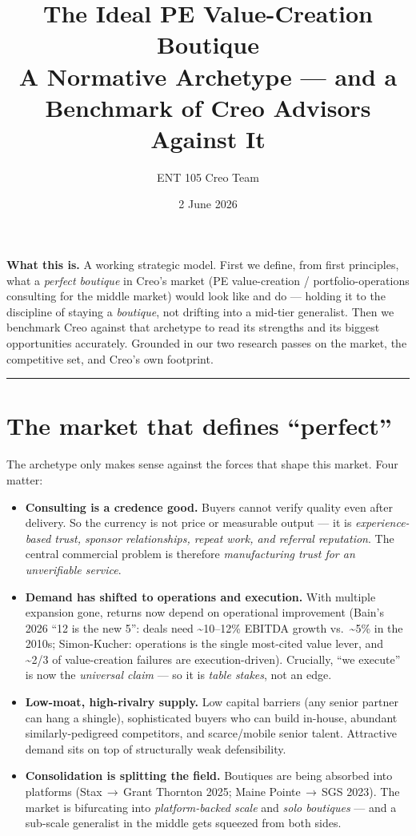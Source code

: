 \documentclass[11pt]{article}
\title{\textbf{The Ideal PE Value-Creation Boutique}\\[3pt]
\large A Normative Archetype --- and a Benchmark of Creo Advisors Against It}
\author{\normalsize ENT 105 Creo Team}
\date{\normalsize 2 June 2026}
\begin{document}
\maketitle

\begin{takeaway}
\textbf{What this is.} A working strategic model. First we define, from first
principles, what a \emph{perfect boutique} in Creo's market (PE value-creation /
portfolio-operations consulting for the middle market) would look like and do --- holding
it to the discipline of staying a \emph{boutique}, not drifting into a mid-tier generalist.
Then we benchmark Creo against that archetype to read its strengths and its biggest
opportunities accurately. Grounded in our two research passes on the market, the competitive
set, and Creo's own footprint.
\end{takeaway}

\tableofcontents
\vspace{0.8em}\hrule\vspace{0.8em}

\section{The market that defines ``perfect''}
The archetype only makes sense against the forces that shape this market. Four matter:

\begin{itemize}
  \item \textbf{Consulting is a credence good.} Buyers cannot verify quality even after
  delivery. So the currency is not price or measurable output --- it is
  \emph{experience-based trust, sponsor relationships, repeat work, and referral
  reputation}. The central commercial problem is therefore \emph{manufacturing trust for an
  unverifiable service}.
  \item \textbf{Demand has shifted to operations and execution.} With multiple expansion
  gone, returns now depend on operational improvement (Bain's 2026 ``12 is the new 5'':
  deals need \textasciitilde{}10--12\% EBITDA growth vs.\ \textasciitilde{}5\% in the 2010s;
  Simon-Kucher: operations is the single most-cited value lever, and \textasciitilde{}2/3
  of value-creation failures are execution-driven). Crucially, ``we execute'' is now the
  \emph{universal claim} --- so it is \emph{table stakes}, not an edge.
  \item \textbf{Low-moat, high-rivalry supply.} Low capital barriers (any senior partner
  can hang a shingle), sophisticated buyers who can build in-house, abundant
  similarly-pedigreed competitors, and scarce/mobile senior talent. Attractive demand sits
  on top of structurally weak defensibility.
  \item \textbf{Consolidation is splitting the field.} Boutiques are being absorbed into
  platforms (Stax\,$\to$\,Grant Thornton 2025; Maine Pointe\,$\to$\,SGS 2023). The market
  is bifurcating into \emph{platform-backed scale} and \emph{solo boutiques} --- and a
  sub-scale generalist in the middle gets squeezed from both sides.
\end{itemize}
\end{document}
